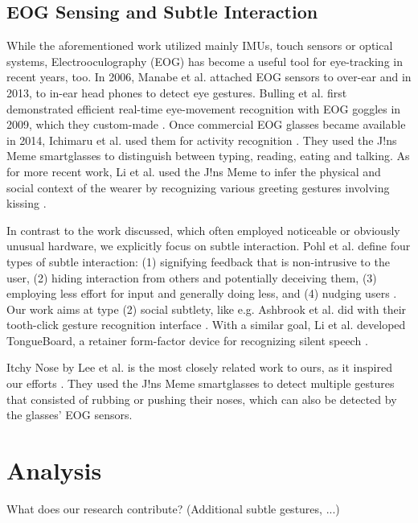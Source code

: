 \documentclass[runningheads]{llncs}
\begin{document}
\subsection{EOG Sensing and Subtle Interaction}
While the aforementioned work utilized mainly IMUs, touch sensors or optical systems,
Electrooculography (EOG) has become a useful tool for eye-tracking in recent years, too. 
In 2006, Manabe et al. attached EOG sensors to over-ear \cite{10.1145/1125451.1125655}
and in 2013, to in-ear head phones \cite{10.1145/2493988.2494329} to detect eye gestures.
Bulling et al. first demonstrated efficient real-time eye-movement recognition
with EOG goggles in 2009, which they custom-made \cite{10.1145/1520340.1520468}.
Once commercial EOG glasses became available in 2014, Ichimaru et al. used them for
activity recognition \cite{10.1145/2638728.2638795}. They used the J!ns Meme
smartglasses to distinguish between typing, reading, eating and talking.
As for more recent work, Li et al. used the J!ns Meme to infer the physical and social
context of the wearer by recognizing various greeting gestures involving kissing
\cite{10.1145/3384657.3384801}.

In contrast to the work discussed, which often employed noticeable or obviously unusual
hardware, we explicitly focus on subtle interaction. Pohl et al. define
four types of subtle interaction: (1) signifying feedback that is non-intrusive to the
user, (2) hiding interaction from others and potentially deceiving them, (3) employing
less effort for input and generally doing less, and (4) nudging users
\cite{10.1145/3290605.3300648}. Our work aims at type (2) social subtlety, like e.g.
Ashbrook et al. did with their tooth-click gesture recognition interface
\cite{10.1145/2935334.2935389}. With a similar goal, Li et al. developed TongueBoard,
a retainer form-factor device for recognizing silent speech \cite{10.1145/3311823.3311831}.

Itchy Nose by Lee et al. is the most closely related work to ours,
as it inspired our efforts \cite{10.1145/3123021.3123060}. They used the J!ns Meme
smartglasses to detect multiple gestures that consisted of rubbing or pushing their
noses, which can also be detected by the glasses' EOG sensors.

\section{Analysis}
What does our research contribute? (Additional subtle gestures, ...)
\end{document}
